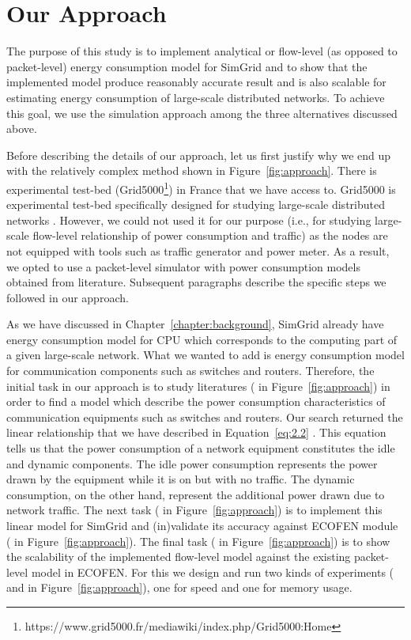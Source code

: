 \section{Our Approach}
\label{section:ourapproach}
The purpose of this study is to implement analytical or flow-level (as opposed to packet-level) energy consumption model for SimGrid and to show that the implemented model produce reasonably accurate result and is also scalable for estimating energy consumption of large-scale distributed networks. To achieve this goal, we use the simulation approach among the three alternatives discussed above. 

Before describing the details of our approach, let us first justify why we end up with the relatively complex method shown in Figure~\ref{fig:approach}. There is experimental test-bed (Grid5000\footnote{https://www.grid5000.fr/mediawiki/index.php/Grid5000:Home}) in France that we have access to. Grid5000 is experimental test-bed specifically designed for studying large-scale distributed networks \cite{DBLP:journals/ijhpca/BolzeCCDDJJLLMMNPQRTT06}. However, we could not used it for our purpose (i.e., for studying large-scale flow-level relationship of power consumption and traffic) as the nodes are not equipped with tools such as traffic generator and power meter. As a result, we opted to use a packet-level simulator with power consumption models obtained from literature. Subsequent paragraphs describe the specific steps we followed in our approach.

As we have discussed in Chapter~\ref{chapter:background}, SimGrid already have energy consumption model for CPU which corresponds to the computing part of a given large-scale network. What we wanted to add is energy consumption model for communication components such as switches and routers. Therefore, the initial task in our approach is to study literatures ( in Figure~\ref{fig:approach}) in order to find a model which describe the power consumption characteristics of communication equipments such as switches and routers. Our search returned the linear relationship that we have described in Equation~\ref{eq:2.2} \cite{Sivaraman,DBLP:journals/comcom/BeisterDAK14,DBLP:conf/networking/MahadevanSBR09,DBLP:conf/sigcomm/MahadevanBS10}. This equation tells us that the power consumption of a network equipment constitutes the idle and dynamic components. The idle power consumption represents the power drawn by the equipment while it is on but with no traffic. The dynamic consumption, on the other hand, represent the additional power drawn due to network traffic. The next task ( in Figure~\ref{fig:approach}) is to implement this linear model for SimGrid and (in)validate its accuracy against ECOFEN module ( in Figure~\ref{fig:approach})\cite{DBLP:conf/wowmom/OrgerieLLL11,DBLP:conf/cloudnet/CorneaOL14}. The final task ( in Figure~\ref{fig:approach}) is to show the scalability of the implemented flow-level model against the existing packet-level model in ECOFEN. For this we design and run two kinds of experiments ( and  in Figure~\ref{fig:approach}), one for speed and one for memory usage. 

